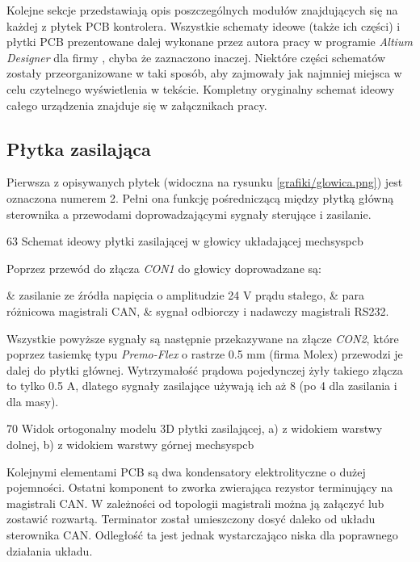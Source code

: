 Kolejne sekcje przedstawiają opis poszczególnych modułów znajdujących się na każdej z płytek PCB kontrolera. Wszystkie schematy ideowe (także ich części) i płytki PCB prezentowane dalej wykonane przez autora pracy w programie {\it Altium Designer} dla firmy \firma{}, chyba że zaznaczono inaczej. Niektóre części schematów zostały przeorganizowane w taki sposób, aby zajmowały jak najmniej miejsca w celu czytelnego wyświetlenia w tekście. Kompletny oryginalny schemat ideowy całego urządzenia znajduje się w załącznikach pracy.

\subsection{Płytka zasilająca}
\label{ss:power_board}

Pierwsza z opisywanych płytek (widoczna na rysunku \ref{grafiki/glowica.png}) jest oznaczona numerem 2. Pełni ona funkcję pośredniczącą między płytką główną sterownika a przewodami doprowadzającymi sygnały sterujące i zasilanie.

	{63}
	{Schemat ideowy płytki zasilającej w głowicy układającej}
	{mechsyspcb}
	
Poprzez przewód do złącza {\it CON1} do głowicy doprowadzane są:

\begin{easylist}
	& zasilanie ze źródła napięcia o amplitudzie 24 V prądu stałego,
	& para różnicowa magistrali CAN,
	& sygnał odbiorczy i nadawczy magistrali RS232.
	\\
\end{easylist} 

Wszystkie powyższe sygnały są następnie przekazywane na złącze {\it CON2}, które poprzez tasiemkę typu {\it Premo-Flex} o rastrze 0.5 mm (firma Molex) przewodzi je dalej do płytki głównej. Wytrzymałość prądowa pojedynczej żyły takiego złącza to tylko 0.5 A, dlatego sygnały zasilające używają ich aż 8 (po 4 dla zasilania i dla masy).

	{70}
	{Widok ortogonalny modelu 3D płytki zasilającej, a) z widokiem warstwy dolnej, b) z widokiem warstwy górnej}
	{mechsyspcb}

Kolejnymi elementami PCB są dwa kondensatory elektrolityczne o dużej pojemności. Ostatni komponent to zworka zwierająca rezystor terminujący na magistrali CAN. W zależności od topologii magistrali można ją załączyć lub zostawić rozwartą. Terminator został umieszczony dosyć daleko od układu sterownika CAN. Odległość ta jest jednak wystarczająco niska dla poprawnego działania układu.

